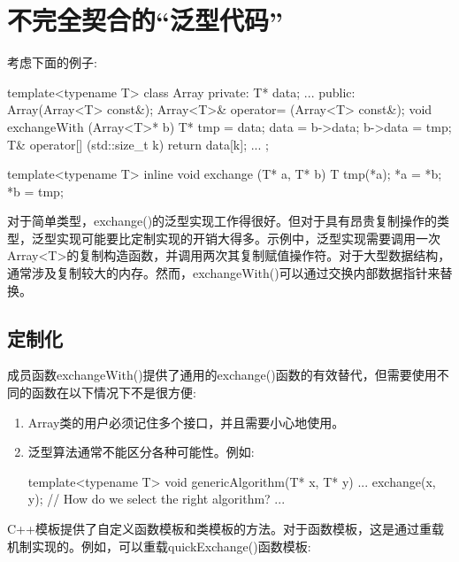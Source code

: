 \section{不完全契合的“泛型代码”}

考虑下面的例子:

\begin{cpp}
template<typename T>
class Array {
	private:
	T* data;
	...
	public:
	Array(Array<T> const&);
	Array<T>& operator= (Array<T> const&);
	void exchangeWith (Array<T>* b) {
		T* tmp = data;
		data = b->data;
		b->data = tmp;
	}
	T& operator[] (std::size_t k) {
		return data[k];
	}
	...
};

template<typename T> inline
void exchange (T* a, T* b)
{
T tmp(*a);
*a = *b;
*b = tmp;
}
\end{cpp}

对于简单类型，exchange()的泛型实现工作得很好。但对于具有昂贵复制操作的类型，泛型实现可能要比定制实现的开销大得多。示例中，泛型实现需要调用一次Array<T>的复制构造函数，并调用两次其复制赋值操作符。对于大型数据结构，通常涉及复制较大的内存。然而，exchangeWith()可以通过交换内部数据指针来替换。

\subsection{定制化}

成员函数exchangeWith()提供了通用的exchange()函数的有效替代，但需要使用不同的函数在以下情况下不是很方便:

\begin{enumerate}
\item 
Array类的用户必须记住多个接口，并且需要小心地使用。

\item 
泛型算法通常不能区分各种可能性。例如:

\begin{cpp}
template<typename T>
void genericAlgorithm(T* x, T* y)
{
	...
	exchange(x, y); // How do we select the right algorithm?
	...
}
\end{cpp}

\end{enumerate}

C++模板提供了自定义函数模板和类模板的方法。对于函数模板，这是通过重载机制实现的。例如，可以重载quickExchange()函数模板:


